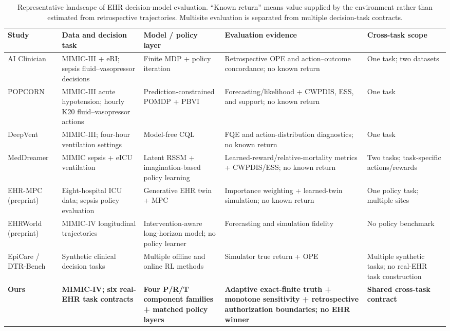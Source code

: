 \documentclass[sigconf,review]{acmart}
\begin{document}
\begin{table}[t]
\centering
\caption{Representative landscape of EHR decision-model evaluation. ``Known return'' means value supplied by the environment rather than estimated from retrospective trajectories. Multisite evaluation is separated from multiple decision-task contracts.}
\label{tab:landscape}
\scriptsize
\begin{tabularx}{\textwidth}{lXXXX}
\toprule
Study & Data and decision task & Model / policy layer & Evaluation evidence & Cross-task scope \\
\midrule
AI Clinician \cite{komorowski2018artificial} & MIMIC-III + eRI; sepsis fluid--vasopressor decisions & Finite MDP + policy iteration & Retrospective OPE and action--outcome concordance; no known return & One task; two datasets \\
POPCORN \cite{futoma2020popcorn} & MIMIC-III acute hypotension; hourly K20 fluid--vasopressor actions & Prediction-constrained POMDP + PBVI & Forecasting/likelihood + CWPDIS, ESS, and support; no known return & One task \\
DeepVent \cite{kondrup2023deepvent} & MIMIC-III; four-hour ventilation settings & Model-free CQL & FQE and action-distribution diagnostics; no known return & One task \\
MedDreamer \cite{xu2026meddreamer} & MIMIC sepsis + eICU ventilation & Latent RSSM + imagination-based policy learning & Learned-reward/relative-mortality metrics + CWPDIS/ESS; no known return & Two tasks; task-specific actions/rewards \\
EHR-MPC \cite{pickard2026ehrmpc} (preprint) & Eight-hospital ICU data; sepsis policy evaluation & Generative EHR twin + MPC & Importance weighting + learned-twin simulation; no known return & One policy task; multiple sites \\
EHRWorld \cite{mu2026ehrworld} (preprint) & MIMIC-IV longitudinal trajectories & Intervention-aware long-horizon model; no policy learner & Forecasting and simulation fidelity & No policy benchmark \\
EpiCare / DTR-Bench \cite{hargrave2024epicare,luo2024dtrbench} & Synthetic clinical decision tasks & Multiple offline and online RL methods & Simulator true return + OPE & Multiple synthetic tasks; no real-EHR task construction \\
\textbf{Ours} & \textbf{MIMIC-IV; six real-EHR task contracts} & \textbf{Four P/R/T component families + matched policy layers} & \textbf{Adaptive exact-finite truth + monotone sensitivity + retrospective authorization boundaries; no EHR winner} & \textbf{Shared cross-task contract} \\
\bottomrule
\end{tabularx}
\end{table}
\end{document}
